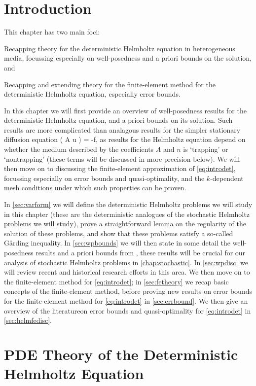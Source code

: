 \section{Introduction}
This chapter has two main foci:
\ben
\item Recapping theory for the deterministic Helmholtz equation in heterogeneous media, focussing especially on well-posedness and a priori bounds on the solution, and
\item Recapping and extending theory for the finite-element method for the deterministic Helmholtz equation, especially error bounds.
  \een

  In this chapter we will first provide an overview of well-posedness results for the deterministic Helmholtz equation, and a priori bounds on its solution. Such results are more complicated than analagous results for the simpler stationary diffusion equation
  \beq\label{eq:stdiff}
\grad \cdot \mleft( A \grad u \mright) = -f,
\eeq
as results for the Helmholtz equation depend on whether the medium described by the coefficients $A$ and $n$ is `trapping' or `nontrapping' (these terms will be discussed in more precision below). We will then move on to discussing the finite-element approximation of \eqref{eq:introdet}, focussing especially on error bounds and quasi-optimality, and the $k$-dependent mesh conditions under which such properties can be proven.

In \cref{sec:varform} we will define the deterministic Helmholtz problems we will study in this chapter (these are the deterministic analogues of the stochastic Helmholtz problems we will study), prove a straightforward lemma on the regularity of the solution of these problems, and show that these problems satisfy a so-called G\r{a}rding inequality. In \cref{sec:wpbounds} we will then state in some detail the well-posedness results and a priori bounds from \cite{GrPeSp:19}, these results will be crucial for our analysis of stochastic Helmholtz problems in \cref{chap:stochastic}. In \cref{sec:wpdisc} we will review recent and historical research efforts in this area. We then move on to the finite-element method for \eqref{eq:introdet}; in \cref{sec:fetheory} we recap basic concepts of the finite-element method, before proving new results on error bounds for the finite-element method for \eqref{eq:introdet} in \cref{sec:errbound}. We then give an overview of the literatureon error bounds and quasi-optimality for \eqref{eq:introdet} in \cref{sec:helmfedisc}.


\section{PDE Theory of the Deterministic Helmholtz Equation}
  

